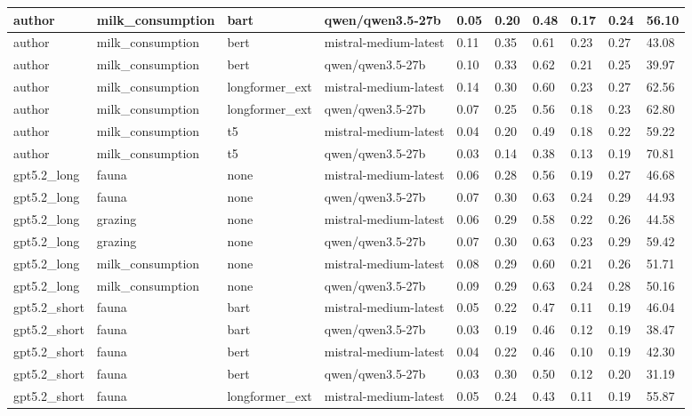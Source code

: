 \begin{tabular}{|l|l|l|l|l|l|l|l|l|l|}
 \hline
 author & milk\_consumption & bart & qwen/qwen3.5-27b & 0.05 & 0.20 & 0.48 & 0.17 & 0.24 & 56.10 \\
 \hline
 author & milk\_consumption & bert & mistral-medium-latest & 0.11 & 0.35 & 0.61 & 0.23 & 0.27 & 43.08 \\
 \hline
 author & milk\_consumption & bert & qwen/qwen3.5-27b & 0.10 & 0.33 & 0.62 & 0.21 & 0.25 & 39.97 \\
 \hline
 author & milk\_consumption & longformer\_ext & mistral-medium-latest & 0.14 & 0.30 & 0.60 & 0.23 & 0.27 & 62.56 \\
 \hline
 author & milk\_consumption & longformer\_ext & qwen/qwen3.5-27b & 0.07 & 0.25 & 0.56 & 0.18 & 0.23 & 62.80 \\
 \hline
 author & milk\_consumption & t5 & mistral-medium-latest & 0.04 & 0.20 & 0.49 & 0.18 & 0.22 & 59.22 \\
 \hline
 author & milk\_consumption & t5 & qwen/qwen3.5-27b & 0.03 & 0.14 & 0.38 & 0.13 & 0.19 & 70.81 \\
 \hline
 gpt5.2\_long & fauna & none & mistral-medium-latest & 0.06 & 0.28 & 0.56 & 0.19 & 0.27 & 46.68 \\
 \hline
 gpt5.2\_long & fauna & none & qwen/qwen3.5-27b & 0.07 & 0.30 & 0.63 & 0.24 & 0.29 & 44.93 \\
 \hline
 gpt5.2\_long & grazing & none & mistral-medium-latest & 0.06 & 0.29 & 0.58 & 0.22 & 0.26 & 44.58 \\
 \hline
 gpt5.2\_long & grazing & none & qwen/qwen3.5-27b & 0.07 & 0.30 & 0.63 & 0.23 & 0.29 & 59.42 \\
 \hline
 gpt5.2\_long & milk\_consumption & none & mistral-medium-latest & 0.08 & 0.29 & 0.60 & 0.21 & 0.26 & 51.71 \\
 \hline
 gpt5.2\_long & milk\_consumption & none & qwen/qwen3.5-27b & 0.09 & 0.29 & 0.63 & 0.24 & 0.28 & 50.16 \\
 \hline
 gpt5.2\_short & fauna & bart & mistral-medium-latest & 0.05 & 0.22 & 0.47 & 0.11 & 0.19 & 46.04 \\
 \hline
 gpt5.2\_short & fauna & bart & qwen/qwen3.5-27b & 0.03 & 0.19 & 0.46 & 0.12 & 0.19 & 38.47 \\
 \hline
 gpt5.2\_short & fauna & bert & mistral-medium-latest & 0.04 & 0.22 & 0.46 & 0.10 & 0.19 & 42.30 \\
 \hline
 gpt5.2\_short & fauna & bert & qwen/qwen3.5-27b & 0.03 & 0.30 & 0.50 & 0.12 & 0.20 & 31.19 \\
 \hline
 gpt5.2\_short & fauna & longformer\_ext & mistral-medium-latest & 0.05 & 0.24 & 0.43 & 0.11 & 0.19 & 55.87 \\

\end{tabular}
